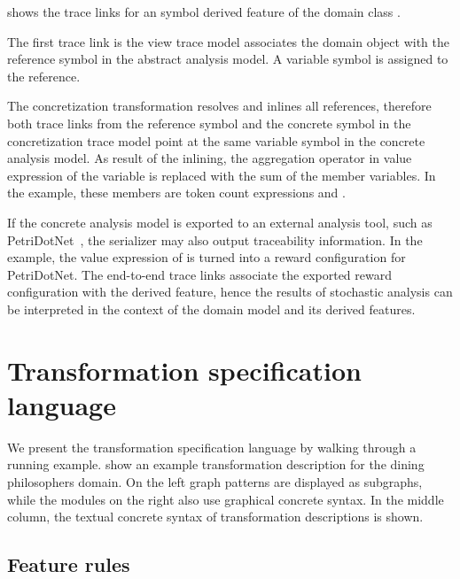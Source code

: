 \begin{runningExample}
   shows the trace links for an  symbol derived feature  of the domain class .

  The first trace link is the view trace model associates the domain object  with the reference symbol  in the abstract analysis model. A variable symbol is assigned to the reference.

  The concretization transformation resolves and inlines all references, therefore both trace links from the reference symbol and the concrete symbol in the concretization trace model point at the same variable symbol in the concrete analysis model. As result of the inlining, the aggregation operator in value expression of the variable is replaced with the sum of the member variables. In the example, these members are token count expressions  and .

  If the concrete analysis model is exported to an external analysis tool, such as PetriDotNet~\citep{Voros17pdn}, the  serializer may also output traceability information. In the example, the value expression of  is turned into a reward configuration for PetriDotNet. The end-to-end trace links associate the exported reward configuration with the derived feature, hence the results of stochastic analysis can be interpreted in the context of the domain model and its derived features.
\end{runningExample}

\section{Transformation specification language}

We present the transformation specification language by walking through a running example.  show an example transformation description for the dining philosophers domain. On the left graph patterns are displayed as subgraphs, while the  modules on the right also use graphical concrete syntax. In the middle column, the textual concrete syntax of transformation descriptions is shown.

\subsection{Feature rules}


